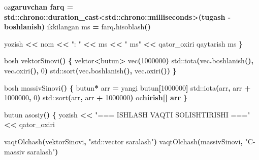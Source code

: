 \documentclass[a4paper,11pt,twoside,openright]{book}
\newenvironment{Shaded}{\begin{snugshade}}{\end{snugshade}}
\newcommand{\BuiltInTok}[1]{#1}
\newcommand{\CharTok}[1]{\textcolor[rgb]{0.31,0.60,0.02}{#1}}
\newcommand{\DecValTok}[1]{\textcolor[rgb]{0.00,0.00,0.81}{#1}}
\newcommand{\ErrorTok}[1]{\textcolor[rgb]{0.64,0.00,0.00}{\textbf{#1}}}
\newcommand{\NormalTok}[1]{#1}
\newcommand{\OperatorTok}[1]{\textcolor[rgb]{0.81,0.36,0.00}{\textbf{#1}}}
\newcommand{\StringTok}[1]{\textcolor[rgb]{0.31,0.60,0.02}{#1}}
\begin{document}
\begin{Shaded}
\begin{Highlighting}[]
\NormalTok{    o}\CharTok{\textquotesingle{}z}\ErrorTok{garuvchan farq = std::chrono::duration\_cast\textless{}std::chrono::milliseconds\textgreater{}(tugash {-} boshlanish)}
\NormalTok{    ikkilangan ms }\OperatorTok{=}\NormalTok{ farq}\OperatorTok{.}\NormalTok{hisoblash}\OperatorTok{()}

\NormalTok{    yozish }\OperatorTok{\textless{}\textless{}}\NormalTok{ nom }\OperatorTok{\textless{}\textless{}} \StringTok{": "} \OperatorTok{\textless{}\textless{}}\NormalTok{ ms }\OperatorTok{\textless{}\textless{}} \StringTok{" ms"} \OperatorTok{\textless{}\textless{}}\NormalTok{ qator\_oxiri}
\NormalTok{    qaytarish ms}
\OperatorTok{\}}

\NormalTok{bosh vektorSinovi}\OperatorTok{()} \OperatorTok{\{}
\NormalTok{    vektor}\OperatorTok{\textless{}}\NormalTok{butun}\OperatorTok{\textgreater{}}\NormalTok{ vec}\OperatorTok{(}\DecValTok{1\textquotesingle{}000\textquotesingle{}000}\OperatorTok{)}
    \BuiltInTok{std::}\NormalTok{iota}\OperatorTok{(}\NormalTok{vec}\OperatorTok{.}\NormalTok{boshlanish}\OperatorTok{(),}\NormalTok{ vec}\OperatorTok{.}\NormalTok{oxiri}\OperatorTok{(),} \DecValTok{0}\OperatorTok{)}
    \BuiltInTok{std::}\NormalTok{sort}\OperatorTok{(}\NormalTok{vec}\OperatorTok{.}\NormalTok{boshlanish}\OperatorTok{(),}\NormalTok{ vec}\OperatorTok{.}\NormalTok{oxiri}\OperatorTok{())}
\OperatorTok{\}}

\NormalTok{bosh massivSinovi}\OperatorTok{()} \OperatorTok{\{}
\NormalTok{    butun}\OperatorTok{*}\NormalTok{ arr }\OperatorTok{=}\NormalTok{ yangi butun}\OperatorTok{[}\DecValTok{1\textquotesingle{}000\textquotesingle{}000}\OperatorTok{]}
    \BuiltInTok{std::}\NormalTok{iota}\OperatorTok{(}\NormalTok{arr}\OperatorTok{,}\NormalTok{ arr }\OperatorTok{+} \DecValTok{1\textquotesingle{}000\textquotesingle{}000}\OperatorTok{,} \DecValTok{0}\OperatorTok{)}
    \BuiltInTok{std::}\NormalTok{sort}\OperatorTok{(}\NormalTok{arr}\OperatorTok{,}\NormalTok{ arr }\OperatorTok{+} \DecValTok{1\textquotesingle{}000\textquotesingle{}000}\OperatorTok{)}
\NormalTok{    o}\CharTok{\textquotesingle{}c}\ErrorTok{hirish[] arr}
\OperatorTok{\}}

\NormalTok{butun asosiy}\OperatorTok{()} \OperatorTok{\{}
\NormalTok{    yozish }\OperatorTok{\textless{}\textless{}} \StringTok{"=== ISHLASH VAQTI SOLISHTIRISHI ==="} \OperatorTok{\textless{}\textless{}}\NormalTok{ qator\_oxiri}

\NormalTok{    vaqtOlchash}\OperatorTok{(}\NormalTok{vektorSinovi}\OperatorTok{,} \StringTok{"std::vector saralash"}\OperatorTok{)}
\NormalTok{    vaqtOlchash}\OperatorTok{(}\NormalTok{massivSinovi}\OperatorTok{,} \StringTok{"C{-}massiv saralash"}\OperatorTok{)}


\end{Highlighting}
\end{Shaded}
\end{document}
